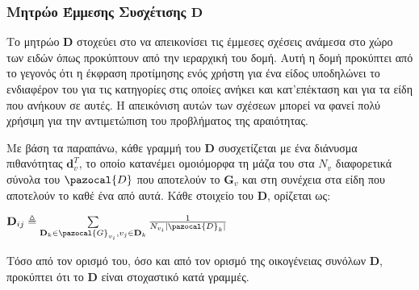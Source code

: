 \subsubsection{Μητρώο Έμμεσης Συσχέτισης $\mathbf{D}$}
Το μητρώο $\mathbf{D}$ στοχεύει στο να απεικονίσει τις έμμεσες σχέσεις ανάμεσα στο χώρο των ειδών όπως προκύπτουν από την ιεραρχική του δομή. Αυτή η δομή προκύπτει από το γεγονός ότι η έκφραση προτίμησης ενός χρήστη για ένα είδος υποδηλώνει το ενδιαφέρον του για τις κατηγορίες στις οποίες ανήκει και κατ'επέκταση και για τα είδη που ανήκουν σε αυτές. Η απεικόνιση αυτών των σχέσεων μπορεί να φανεί πολύ χρήσιμη για την αντιμετώπιση του προβλήματος της αραιότητας. \par
Με βάση τα παραπάνω, κάθε γραμμή του $\mathbf{D}$ συσχετίζεται με ένα διάνυσμα πιθανότητας $\mathbf{d}_v^T$, το οποίο κατανέμει ομοιόμορφα τη μάζα του στα $N_v$ διαφορετικά σύνολα του $\pazocal{D}$ που αποτελούν το $\mathbf{G}_v$ και στη συνέχεια στα είδη που αποτελούν το καθέ ένα από αυτά. Κάθε στοιχείο του $\mathbf{D}$, ορίζεται ως:
\begin{center}
$\mathbf{D}_{ij} \triangleq \sum\limits_{\mathbf{D}_k \in \pazocal{G}_{v_i}, v_j \in \mathbf{D}_k} \frac{1}{N_{v_i}|\pazocal{D}_k|}$
\end{center}
Τόσο από τον ορισμό του, όσο και από τον ορισμό της οικογένειας συνόλων $\mathbf{D}$, προκύπτει ότι το $\mathbf{D}$ είναι στοχαστικό κατά γραμμές. 
